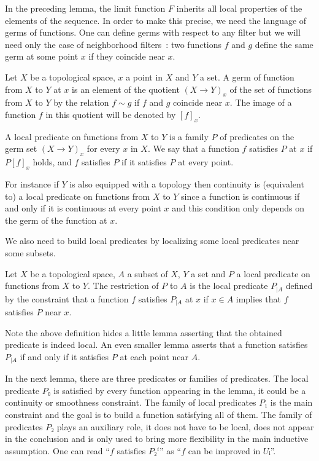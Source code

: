 In the preceding lemma, the limit function $F$ inherits all local properties of
the elements of the sequence. In order to make this precise, we need the
language of germs of functions. One can define germs with respect to any filter but
we will need only the case of neighborhood filters~: two functions $f$ and $g$
define the same germ at some point $x$ if they coincide near $x$.

\begin{definition}\label{def:germ}\leanok
  Let $X$ be a topological space, $x$ a point in $X$ and $Y$ a set. A germ of function
  from $X$ to $Y$ at $x$ is an element of the quotient $(X → Y)_x$ of the set of functions
  from $X$ to $Y$ by the relation $f ∼ g$ if $f$ and $g$ coincide near $x$. The image
  of a function $f$ in this quotient will be denoted by $[f]_x$.

  A local predicate on functions from $X$ to $Y$ is a family $P$ of predicates on the
  germ set $(X → Y)_x$ for every $x$ in $X$. We say that a function $f$
  satisfies $P$ at $x$ if $P [f]_x$ holds, and $f$ satisfies $P$ if it
  satisfies $P$ at every point.
\end{definition}

For instance if $Y$ is also equipped with a topology then continuity is
(equivalent to) a local predicate on functions from $X$ to $Y$ since a function
is continuous if and only if it is continuous at every point $x$ and this
condition only depends on the germ of the function at $x$.

We also need to build local predicates by localizing some local predicates near
some subsets.

\begin{definition}
  \label{def:restrict_germ_predicate}\leanok
  Let $X$ be a topological space, $A$ a subset of $X$, $Y$ a set and $P$ a
  local predicate on functions from $X$ to $Y$. The restriction of $P$ to $A$
  is the local predicate $P_{|A}$ defined by the constraint that a function
  $f$ satisfies $P_{|A}$ at $x$ if $x ∈ A$ implies that $f$ satisfies $P$ near $x$.
\end{definition}

Note the above definition hides a little lemma asserting that the obtained
predicate is indeed local. An even smaller lemma asserts that a function satisfies
$P_{|A}$ if and only if it satisfies $P$ at each point near $A$.

In the next lemma, there are three predicates or families of predicates. The
local predicate $P₀$ is satisfied by every function appearing in the lemma, it
could be a continuity or smoothness constraint. The family of local predicates
$P₁$ is the main constraint and the goal is to build a function satisfying all
of them. The family of predicates $P₂$ plays an auxiliary role, it does not
have to be local, does not appear in the conclusion and is only used to bring more
flexibility in the main inductive assumption. One can read ``$f$ satisfies
$P₂^i$'' as ``$f$ can be improved in $Uᵢ$''.

